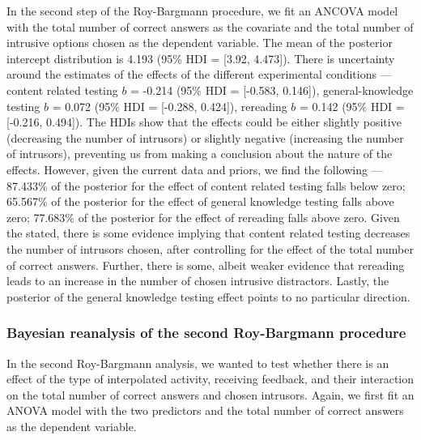 \documentclass[11pt,]{article}
\begin{document}
In the second step of the Roy-Bargmann procedure, we fit an ANCOVA model
with the total number of correct answers as the covariate and the total
number of intrusive options chosen as the dependent variable. The mean
of the posterior intercept distribution is 4.193 (95\% HDI = {[}3.92,
4.473{]}). There is uncertainty around the estimates of the effects of
the different experimental conditions --- content related testing \(b\)
= -0.214 (95\% HDI = {[}-0.583, 0.146{]}), general-knowledge testing
\(b\) = 0.072 (95\% HDI = {[}-0.288, 0.424{]}), rereading \(b\) = 0.142
(95\% HDI = {[}-0.216, 0.494{]}). The HDIs show that the effects could
be either slightly positive (decreasing the number of intrusors) or
slightly negative (increasing the number of intrusors), preventing us
from making a conclusion about the nature of the effects. However, given
the current data and priors, we find the following --- 87.433\% of the
posterior for the effect of content related testing falls below zero;
65.567\% of the posterior for the effect of general knowledge testing
falls above zero; 77.683\% of the posterior for the effect of rereading
falls above zero. Given the stated, there is some evidence implying that
content related testing decreases the number of intrusors chosen, after
controlling for the effect of the total number of correct answers.
Further, there is some, albeit weaker evidence that rereading leads to
an increase in the number of chosen intrusive distractors. Lastly, the
posterior of the general knowledge testing effect points to no
particular direction.

\hypertarget{bayesian-reanalysis-of-the-second-roy-bargmann-procedure}{%
\subsubsection{Bayesian reanalysis of the second Roy-Bargmann
procedure}\label{bayesian-reanalysis-of-the-second-roy-bargmann-procedure}}

In the second Roy-Bargmann analysis, we wanted to test whether there is
an effect of the type of interpolated activity, receiving feedback, and
their interaction on the total number of correct answers and chosen
intrusors. Again, we first fit an ANOVA model with the two predictors
and the total number of correct answers as the dependent variable.
\end{document}
